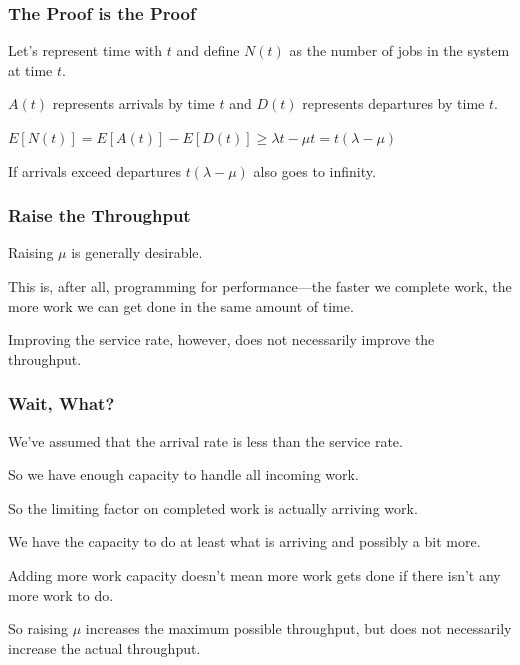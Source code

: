 \begin{frame}
\frametitle{The Proof is the Proof}

Let's represent time with $t$ and define $N(t)$ as the number of jobs in the system at time $t$.

$A(t)$ represents arrivals by time $t$ and $D(t)$ represents departures by time $t$.

\begin{center}
	$E[N(t)] = E[A(t)] - E[D(t)] \geq \lambda t - \mu t = t (\lambda - \mu) $
\end{center}

If arrivals exceed departures  $t (\lambda - \mu) $ also goes to infinity.

\end{frame}



\begin{frame}
\frametitle{Raise the Throughput}

Raising $\mu$ is generally desirable. 

This is, after all, programming for performance---the faster we complete work, the more work we can get done in the same amount of time. 

Improving the service rate, however, does not necessarily improve the throughput. 

\end{frame}



\begin{frame}
\frametitle{Wait, What?}

We've assumed that the arrival rate is less than the service rate. 

So we have enough capacity to handle all incoming work. 

So the limiting factor on completed work is actually arriving work. 

We have the capacity to do at least what is arriving and possibly a bit more. 

Adding more work capacity doesn't mean more work gets done if there isn't any more work to do.

So raising $\mu$ increases the maximum possible throughput, but does not necessarily increase the actual throughput.

\end{frame}




